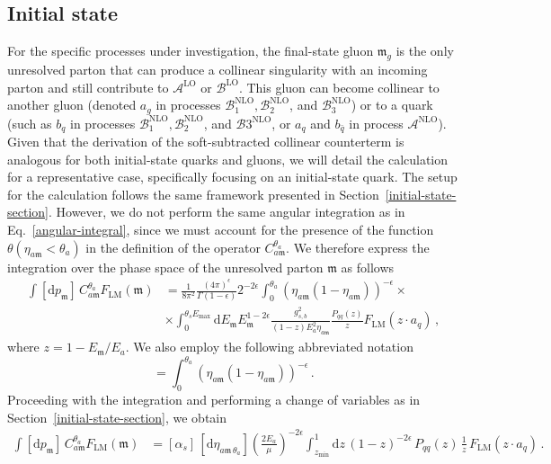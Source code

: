 \documentclass[a4paper, 12pt]{book}
\newcommand{\um}{\mathfrak{m}}
\begin{document}
\subsection{Initial state}
For the specific processes under investigation, the final-state gluon $\um_g$ is the only unresolved parton that can produce a collinear singularity with an incoming parton and still contribute to $\mathcal{A}^{\mathrm{LO}}$ or $\mathcal{B}^{\mathrm{LO}}$. This gluon can become collinear to another gluon (denoted $a_g$ in processes $\mathcal{B}_1^{\mathrm{NLO}}, \mathcal{B}_2^{\mathrm{NLO}}$, and $\mathcal{B}_3^{\mathrm{NLO}}$) or to a quark (such as $b_q$ in processes $\mathcal{B}_1^{\mathrm{NLO}}, \mathcal{B}_2^{\mathrm{NLO}}$, and $\mathcal{B}3^{\mathrm{NLO}}$, or $a_q$ and $b_{\bar{q}}$ in process $\mathcal{A}^{\mathrm{NLO}}$). Given that the derivation of the soft-subtracted collinear counterterm is analogous for both initial-state quarks and gluons, we will detail the calculation for a representative case, specifically focusing on an initial-state quark. The setup for the calculation follows the same framework presented in Section~\ref{initial-state-section}. However, we do not perform the same angular integration as in Eq.~\ref{angular-integral}, since we must account for the presence of the function $\theta(\eta_{a\um}<\theta_a)$ in the definition of the operator $C_{a\um}^{\theta_a}$. We therefore express the integration over the phase space of the unresolved parton $\um$ as follows
\begin{equation}
  \begin{aligned}
  \int [\mathrm{d}p_\um]\, C_{a\um}^{\theta_a}  F_{\mathrm{LM}} (\um) &= \frac{1}{8\pi^2} \frac{(4\pi)^{\epsilon}}{\Gamma(1-\epsilon)} 2^{-2\epsilon} \int_0^{\theta_a} (\eta_{a\um}(1-\eta_{a\um}))^{-\epsilon} \times \\
  & \times \int_{0}^{\theta_s E_{\mathrm{max}}} \mathrm{d}E_\um E_\um^{1-2\epsilon} \frac{g_{s,b}^2}{(1-z)E_a^2 \eta_{a\um}} \frac{P_{qq}(z)}{z} F_{\mathrm{LM}} (z \cdot a_q) \, ,
  \end{aligned}
\end{equation}
where $z=1-E_\um/E_a$. We also employ the following abbreviated notation
\begin{equation}
  [\mathrm{d}\eta_{a\um \, \theta_a}] = \int_0^{\theta_a} (\eta_{a\um}(1-\eta_{a\um}))^{-\epsilon} \, .
\end{equation}
Proceeding with the integration and performing a change of variables as in Section~\ref{initial-state-section}, we obtain
\begin{equation}
  \begin{aligned}
  \int [\mathrm{d}p_\um]\, C_{a\um}^{\theta_a}  F_{\mathrm{LM}} (\um) &= [\alpha_s]\,  [\mathrm{d}\eta_{a\um \, \theta_a}] \left(\frac{2E_a}{\mu}\right)^{-2\epsilon} \int_{z_{\mathrm{min}}}^{1} \mathrm{d}z \, (1-z)^{-2\epsilon} \, P_{qq}(z) \, \frac{1}{z} \, F_{\mathrm{LM}}(z\cdot a_q ) \, .
  \end{aligned}
\end{equation}
\end{document}
